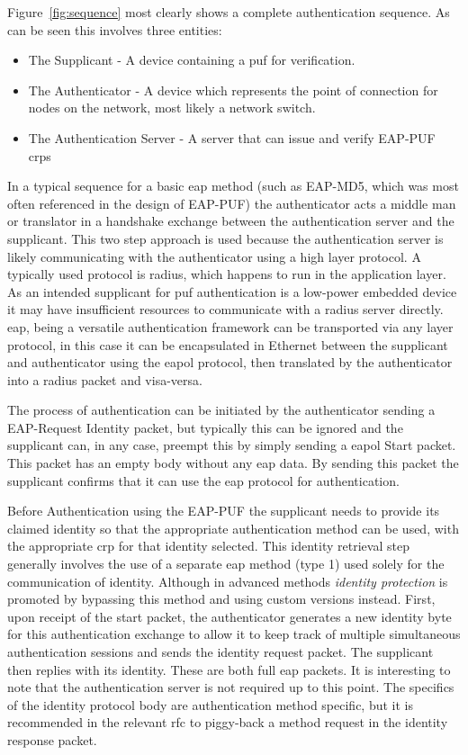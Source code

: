 Figure~\ref{fig:sequence} most clearly shows a complete authentication sequence.
As can be seen this involves three entities:

\begin{itemize}
\item The Supplicant - A device containing a \gls{puf} for verification.
\item The Authenticator - A device which represents the point of connection for nodes on the network, most likely a network switch.
\item The Authentication Server - A server that can issue and verify EAP-PUF \glspl{crp}
\end{itemize}

In a typical sequence for a basic \gls{eap} method (such as EAP-MD5, which was
most often referenced in the design of EAP-PUF) the authenticator acts a middle
man or translator in a handshake exchange between the authentication server
and the supplicant.
This two step approach is used because the authentication server is likely communicating with the
authenticator using a high layer protocol. A typically used protocol is
\gls{radius}, which happens to run in the application layer. As an intended
supplicant for \gls{puf} authentication is a low-power embedded device it may
have insufficient resources to communicate with a \gls{radius} server directly.
\Gls{eap}, being a versatile authentication framework can be transported via
any layer protocol, in this case it can be encapsulated in Ethernet between the
supplicant and authenticator using the \gls{eapol} protocol, then translated by
the authenticator into a \gls{radius} packet and visa-versa.

The process of authentication can be initiated by the authenticator
sending a EAP-Request Identity packet, but typically this can be ignored and the
supplicant can, in any case, preempt this by simply sending a \gls{eapol} Start packet.
This packet has an empty body without any \gls{eap} data. By sending this packet
the supplicant confirms that it can use the \gls{eap} protocol for authentication.

Before Authentication using the EAP-PUF the supplicant needs to
provide its claimed identity so that the appropriate authentication method can be
used, with the appropriate \gls{crp} for that identity selected.
This identity retrieval step generally involves the use of
a separate \gls{eap} method (type 1) used solely for the communication of identity. Although
in advanced methods \emph{identity protection} is promoted by bypassing this method
and using custom versions instead.
First, upon receipt of the start packet, the authenticator generates a new
identity byte for this authentication exchange to allow it to keep track of multiple
simultaneous authentication sessions and sends the identity request packet.
The supplicant then replies with its identity. These are both full \gls{eap}
packets. It is interesting to note that the authentication server is not
required up to this point. The specifics of the identity protocol body are
authentication method specific, but it is recommended in the relevant \gls{rfc}
to piggy-back a method request in the identity response packet.

